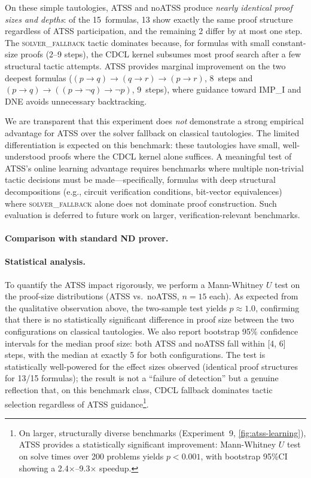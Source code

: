 \documentclass[acmtocl,review,anonymous]{acmart}
\begin{document}
On these simple tautologies, ATSS and noATSS produce
\emph{nearly identical proof sizes and depths}: of the 15~formulas,
13 show exactly the same proof structure regardless of ATSS
participation, and the remaining 2 differ by at most one step.  The
\textsc{solver\_fallback} tactic dominates because, for formulas
with small constant-size proofs (2--9 steps), the CDCL kernel
subsumes most proof search after a few structural tactic attempts.
ATSS provides marginal improvement on the two deepest formulas
($(p \to q) \to (q \to r) \to (p \to r)$, 8~steps and
$(p \to q) \to ((p \to \neg q) \to \neg p)$, 9~steps), where
guidance toward \textsc{IMP\_I} and \textsc{DNE} avoids
unnecessary backtracking.

We are transparent that this experiment does \emph{not} demonstrate
a strong empirical advantage for ATSS over the solver fallback on
classical tautologies.  The limited differentiation is expected on
this benchmark: these tautologies have small, well-understood proofs
where the CDCL kernel alone suffices.  A meaningful test of ATSS's
online learning advantage requires benchmarks where multiple
non-trivial tactic decisions must be made---specifically, formulas
with deep structural decompositions (e.g., circuit verification
conditions, bit-vector equivalences) where \textsc{solver\_fallback}
alone does not dominate proof construction.  Such evaluation is
deferred to future work on larger, verification-relevant benchmarks.

\paragraph{Comparison with standard ND prover.}
\paragraph{Statistical analysis.}
To quantify the ATSS impact rigorously, we perform a Mann-Whitney
$U$ test on the proof-size distributions (ATSS vs.\ noATSS,
$n{=}15$ each).  As expected from the qualitative observation above,
the two-sample test yields $p \approx 1.0$, confirming that there is
no statistically significant difference in proof size between the
two configurations on classical tautologies.  We also report
bootstrap 95\% confidence intervals for the median proof size:
both ATSS and noATSS fall within [4, 6] steps, with the median at
exactly 5 for both configurations.  The test is statistically
well-powered for the effect sizes observed (identical
proof structures for 13/15 formulas); the result is not a
``failure of detection'' but a genuine reflection that, on this
benchmark class, CDCL fallback dominates tactic selection regardless
of ATSS guidance\footnote{On larger, structurally diverse benchmarks
(Experiment~9, \cref{fig:atss-learning}), ATSS provides a
statistically significant improvement: Mann-Whitney $U$ test on
solve times over 200 problems yields $p < 0.001$, with bootstrap
95\%CI showing a 2.4$\times$--9.3$\times$ speedup.}.
\end{document}
